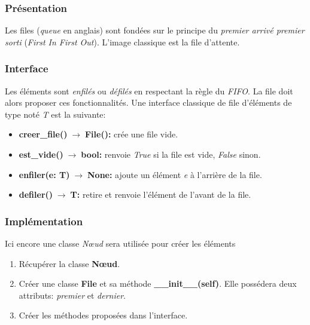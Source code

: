 \documentclass[a4paper,11pt]{article}
\begin{document}
\begin{Form}
\subsubsection{Présentation}
Les files (\emph{queue} en anglais) sont fondées sur le principe du \emph{premier arrivé premier sorti} (\emph{First In First Out}). L'image classique est la file d'attente.
\begin{figure}[!h]
\centering
{}
\end{figure}
\subsubsection{Interface}
Les éléments sont \emph{enfilés} ou \emph{défilés} en respectant la règle du \emph{FIFO}. La file doit alors proposer ces fonctionnalités. Une interface classique de file  d'éléments de type noté \emph{T} est la suivante:
\begin{itemize}
\item \textbf{creer\_file()$\;\rightarrow\;$File():} crée une file vide.
\item \textbf{est\_vide()$\;\rightarrow\;$bool:} renvoie \emph{True} si la file est vide, \emph{False} sinon.
\item \textbf{enfiler(e: T)$\;\rightarrow\;$None:} ajoute un élément \emph{e} à l'arrière de la file.
\item \textbf{defiler()$\;\rightarrow\;$T:} retire et renvoie l'élément de l'avant de la file.
\end{itemize}
\subsubsection{Implémentation}
Ici encore une classe \emph{Nœud} sera utilisée pour créer les éléments
\begin{activite}
\begin{enumerate}
\item Récupérer la classe \textbf{Nœud}. 
\item Créer une classe \textbf{File} et sa méthode \textbf{\_\_init\_\_(self)}. Elle possédera deux attributs: \emph{premier} et \emph{dernier}.
\item Créer les méthodes proposées dans l'interface.
\end{enumerate}
\end{activite}

\end{Form}
\end{document}

